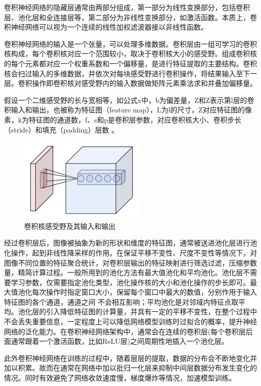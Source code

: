 卷积神经网络的隐藏层通常由两部分组成，第一部分为线性变换部分，包括卷积层、池化层和全连接层等，第二部分为非线性变换部分，如激活函数。本质上，卷积神经网络可以视为一个连续的线性加权滤波器接以非线性函数。

卷积神经网络的输入是一个张量，可以处理多维数据。卷积层由一组可学习的卷积核构成，每个卷积核对应一个范围较小，取决于卷积核大小的感受野。组成卷积核的每个元素都对应一个权重系数和一个偏移量，是进行特征提取的主要结构。卷积核会扫过输入的多维数据，并依次对每块感受野进行卷积操作，将结果输入至下一层。卷积操作即卷积核对感受野内的输入数据做矩阵元素乘法求和并叠加偏移量。

假设一个二维感受野的长与宽相等，如公式x中，b为偏差量，Z和Z表示第l层的卷积输入和输出，也被称为特征图（feature map），L为l的尺寸，Z对应特征图的像素，k为特征图的通道数，f、s和p是卷积层参数，对应卷积核大小、卷积步长（stride）和填充（padding）层数 。

\begin{figure}[h]
	\centering
	\includegraphics[scale=0.4]{figures/8.png}
	\caption{卷积核感受野及其输入和输出}
	\label{fig:f8}
\end{figure}

经过卷积层后，图像被抽象为新的形状和维度的特征图，通常被送进池化层进行池化操作，起到非线性降采样的作用。在保证平移不变性、尺度不变性等情况下，对图像不同位置的特征聚合统计，对卷积层输出的特征映射进行筛选过滤，压缩参数量，精简计算过程。一般所用到的池化方法有最大值池化和平均池化。池化层不需要学习参数，仅需要指定池化类型，池化操作核的大小和池化操作的步长即可。最大值池化每次操作时指定窗口大小，保留每个窗口中最大的数值，分别作用于输入特征图的各个通道，通道之间 不会相互影响；平均池化是对邻域内特征点取平均。池化层的引入降低特征图的计算量，并具有一定的平移不变性，在整个过程中不会丢失重要信息，一定程度上可以降低网络模型训练时过拟合的概率，提升神经网络的泛化能力。在卷积神经网络架构中，通常会在连续的卷积层(每个卷积层后面通常跟着一个激活函数，比如ReLU层)之间周期性地插入一个池化层。

此外卷积神经网络在训练的过程中，随着层层的提取，数据的分布会不断地变化并加以积累。故而在通常在网络中加以批归一化层来抑制中间层数据分布发生变化的情况。同时有效避免了网络收敛速度慢，梯度爆炸等情况，加速模型训练。

